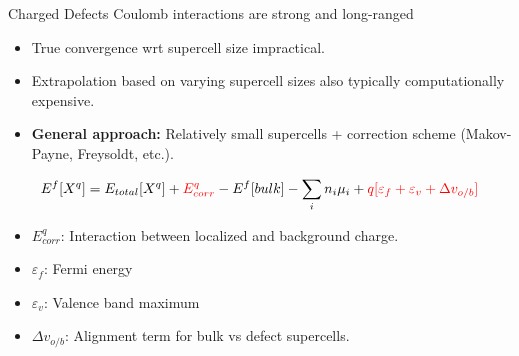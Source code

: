 \documentclass[aspectratio=169]{beamer}
\begin{document}
    \begin{frame}{Charged Defects}
        Coulomb interactions are strong and long-ranged
        \begin{itemize}
            \item True convergence wrt supercell size impractical.
            \item Extrapolation based on varying supercell sizes also typically computationally expensive.
            \item \textbf{General approach:} Relatively small supercells + correction scheme (Makov-Payne, Freysoldt, etc.).\cite{komsaComparisonVariousFinitesize2012}
        \end{itemize}

        \begin{equation*}
            E^f[X^q] = E_{total}[X^q] +\textcolor{red}{E^q_{corr}} - E^f[bulk] - \sum_i n_i \mu_i +\textcolor{red}{q[\varepsilon_f + \varepsilon_v +\Delta v_{o/b}]}
        \end{equation*}
        \begin{itemize}
            \item $E^q_{corr}$: Interaction between localized and background charge.
            \item $\varepsilon_f$: Fermi energy
            \item $\varepsilon_v$: Valence band maximum
            \item $\Delta v_{o/b}$: Alignment term for bulk vs defect supercells.
        \end{itemize}

    \end{frame}
\end{document}
